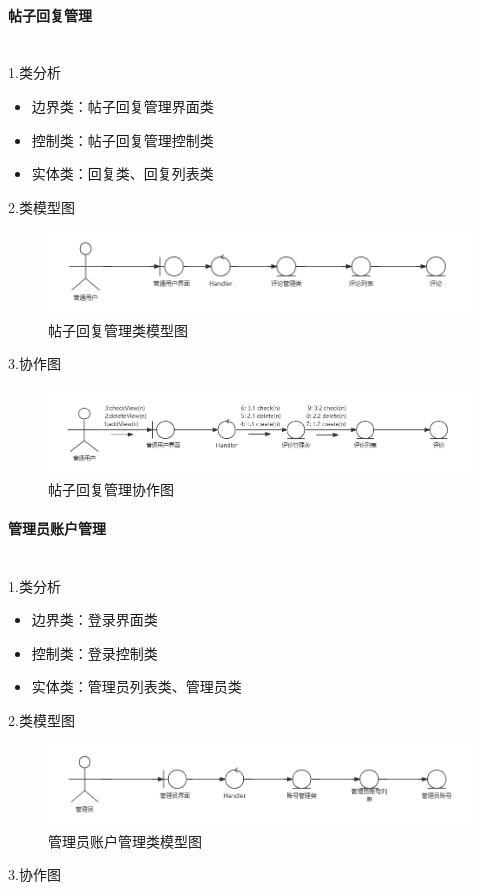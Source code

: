 \documentclass[UTF8]{ctexart}
\newcommand{\subsubsubsection}[1]{\paragraph{#1}\mbox{}\\} %
\begin{document}
\subsubsubsection{帖子回复管理}

1.类分析
\begin{itemize}
  \item 边界类：帖子回复管理界面类
  \item 控制类：帖子回复管理控制类
  \item 实体类：回复类、回复列表类
\end{itemize}

2.类模型图

\begin{figure}[H]
  \centering
  \includegraphics[scale=0.3]{类图/用户评论.png}
  \caption{帖子回复管理类模型图}
\end{figure}


3.协作图

\begin{figure}[H]
  \centering
  \includegraphics[scale=0.3]{协作图/用户评论.png}
  \caption{帖子回复管理协作图}
\end{figure}


\subsubsubsection{管理员账户管理}

1.类分析
\begin{itemize}
  \item 边界类：登录界面类
  \item 控制类：登录控制类
  \item 实体类：管理员列表类、管理员类
\end{itemize}

2.类模型图

\begin{figure}[H]
  \centering
  \includegraphics[scale=0.3]{类图/管理员账号.png}
  \caption{管理员账户管理类模型图}
\end{figure}
3.协作图
\end{document}
